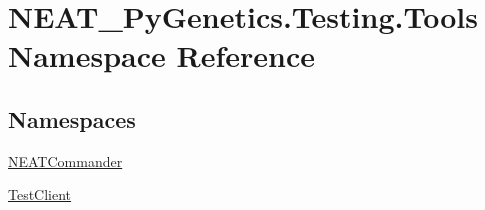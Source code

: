 \hypertarget{namespaceNEAT__PyGenetics_1_1Testing_1_1Tools}{}\section{N\+E\+A\+T\+\_\+\+Py\+Genetics.\+Testing.\+Tools Namespace Reference}
\label{namespaceNEAT__PyGenetics_1_1Testing_1_1Tools}
\subsection*{Namespaces}
\begin{DoxyCompactItemize}
\item 
 \hyperlink{namespaceNEAT__PyGenetics_1_1Testing_1_1Tools_1_1NEATCommander}{N\+E\+A\+T\+Commander}
\item 
 \hyperlink{namespaceNEAT__PyGenetics_1_1Testing_1_1Tools_1_1TestClient}{Test\+Client}
\end{DoxyCompactItemize}
